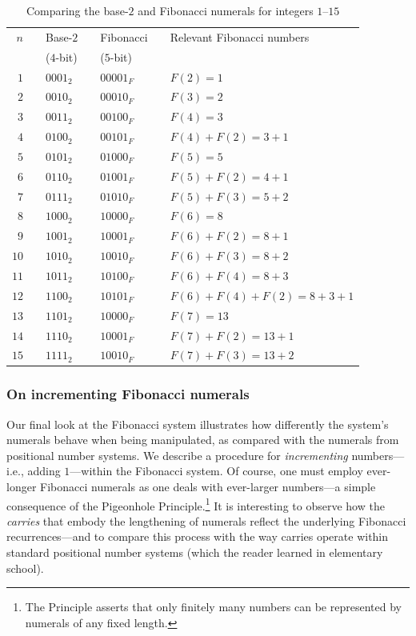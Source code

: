 \begin{table}[htb]
\caption{Comparing the base-$2$ and Fibonacci numerals for integers $1$--$15$}
\label{tab:FIBO1-15}
\begin{tabular}{|rclclcl|}
\hline
$n$ & & Base-$2$  & & Fibonacci  & & Relevant Fibonacci numbers \\
       & & ($4$-bit)    & & ($5$-bit)   & & \\
\hline
\hline
$1$ & & $0001_2$ & & $00001_F$ & & $F(2) =1$ \\
\hline
$2$ & & $0010_2$ & & $00010_F$ & & $F(3) = 2$ \\
\hline
$3$ & & $0011_2$ & &  $00100_F$ & & $F(4) = 3$ \\
\hline
$4$ & & $0100_2$ & &  $00101_F$ & & $F(4) + F(2) = 3+1$ \\ 
\hline
$5$ & & $0101_2$ & &  $01000_F$ & & $F(5) = 5$ \\
\hline
$6$ & & $0110_2$ & &  $01001_F$ & & $F(5) + F(2) = 4+1$ \\
\hline 
$7$ & & $0111_2$ & &  $01010_F$ & &  $F(5) + F(3) = 5+2$ \\
\hline 
$8$ & & $1000_2$ & & $10000_F$ & &  $F(6) = 8$ \\ 
\hline
$9$ & & $1001_2$ & & $10001_F$ & &  $F(6) + F(2) = 8 +1$ \\ 
\hline
$10$ & & $1010_2$ & & $10010_F$ & &  $F(6) + F(3) = 8 +2$ \\ 
\hline
$11$ & & $1011_2$ & & $10100_F$ & &  $F(6) + F(4) = 8 +3$ \\ 
\hline
$12$ & & $1100_2$ & & $10101_F$ & &  $F(6) + F(4) + F(2) = 8 +3 +1$ \\ 
\hline
$13$ & & $1101_2$ & & $10000_F$ & &  $F(7) = 13$ \\ 
\hline
$14$ & & $1110_2$ & & $10001_F$ & &  $F(7)  + F(2) = 13 +1$ \\ 
\hline
$15$ & & $1111_2$ & & $10010_F$ & &  $F(7) + F(3) = 13 +2$ \\ 
\hline
\end{tabular}
\end{table}
 
\subsubsection{On incrementing Fibonacci numerals}

Our final look at the Fibonacci system illustrates how differently the system's numerals behave  when being manipulated, as compared with the numerals from positional number systems.  We describe a procedure for {\em incrementing} numbers---i.e., adding $1$---within the Fibonacci system.  Of course, one must employ ever-longer Fibonacci numerals as one deals with ever-larger numbers---a simple consequence of the Pigeonhole Principle.\footnote{The Principle asserts that only finitely many numbers can be represented by numerals of any fixed length.}  It is interesting to observe how the {\em carries} that embody the lengthening of numerals reflect the underlying Fibonacci recurrences---and to compare this process with the way carries operate within standard positional number systems (which the reader learned in elementary school).

